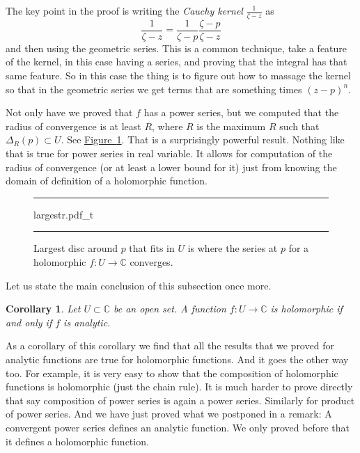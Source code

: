 \documentclass[12pt,openany]{book}
\newcommand{\C}{{\mathbb{C}}}
\newcommand{\myindex}[1]{#1\index{#1}}
\theoremstyle{plain}
\newtheorem{cor}[thm]{Corollary}
\theoremstyle{remark}
\theoremstyle{definition}
\newenvironment{myfig}{%
\begin{figure}[h!t]
\noindent\rule{\textwidth}{0.4pt}\vspace{12pt}\par\centering}%
{\par\noindent\rule{\textwidth}{0.4pt}
\end{figure}}
\theoremstyle{exercise}
\theoremstyle{example}
\newcommand{\figureref}[1]{\hyperref[#1]{Figure~\ref*{#1}}}
\begin{document}
The key point in the proof is writing the \emph{\myindex{Cauchy kernel}}
$\frac{1}{\zeta-z}$ as
\begin{equation*}
\frac{1}{\zeta-z}
=
\frac{1}{\zeta-p}
\frac{\zeta-p}{\zeta-z}
\end{equation*}
and then using the geometric series.  This is a common technique, take a
feature of the kernel, in this case having a series, and proving that the
integral has that same feature.  So in this case the thing is to figure out
how to massage the kernel so that in the geometric series we get terms
that are something times ${(z-p)}^n$.

Not only have we proved
that $f$ has a power series, but we computed
that the radius of convergence is at least $R$, where $R$ is the maximum $R$
such that $\Delta_R(p) \subset U$.  See \figureref{fig:largestr}.
That is a surprisingly powerful result.
Nothing like that is true for power series in real variable.
It allows for computation of the radius of convergence (or at least a lower
bound for it) just from knowing the 
domain of definition of a holomorphic function.

\begin{myfig}
{largestr.pdf_t}
\caption{Largest disc around $p$ that fits in $U$
is where the series at $p$
for a holomorphic $f \colon U \to \C$ converges.%
\label{fig:largestr}}
\end{myfig}

Let us state the main conclusion of this subsection once more.

\begin{cor}
Let $U \subset \C$ be an open set.  A function $f \colon U \to \C$
is holomorphic if and only if $f$ is analytic.
\end{cor}

As a corollary of this corollary we find that all the results that we proved
for analytic functions are true for holomorphic functions.  And it goes the
other way too.  For example, it is very easy to show that the composition of
holomorphic functions is holomorphic (just the chain rule).  It is much
harder to prove directly that say composition of power series is again a
power series.  Similarly for product of power series.
And we have just proved what we postponed in a remark: A convergent power
series defines an analytic function.  We only proved before that it defines
a holomorphic function.
\end{document}
